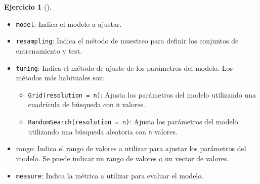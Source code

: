 \documentclass[
  a4paper,
]{scrreport}
\providecommand{\tightlist}{%
  \setlength{\itemsep}{0pt}\setlength{\parskip}{0pt}}\usepackage{longtable,booktabs,array}
\theoremstyle{definition}
\newtheorem{exercise}{Ejercicio}[chapter]
\theoremstyle{remark}
\begin{document}
\begin{exercise}[]
\begin{enumerate}
\begin{tcolorbox}
  \begin{itemize}
  \tightlist
  \item
    \texttt{model}: Indica el modelo a ajustar.
  \item
    \texttt{resampling}: Indica el método de muestreo para definir los
    conjuntos de entrenamiento y test.
  \item
    \texttt{tuning}: Indica el método de ajuste de los parámetros del
    modelo. Los métodos más habituales son:

    \begin{itemize}
    \tightlist
    \item
      \texttt{Grid(resolution\ =\ n)}: Ajusta los parámetros del modelo
      utilizando una cuadrícula de búsqueda con \texttt{n} valores.
    \item
      \texttt{RandomSearch(resolution\ =\ n)}: Ajusta los parámetros del
      modelo utilizando una búsqueda aleatoria con \texttt{n} valores.
    \end{itemize}
  \item
    range: Indica el rango de valores a utilizar para ajustar los
    parámetros del modelo. Se puede indicar un rango de valores o un
    vector de valores.
  \item
    \texttt{measure}: Indica la métrica a utilizar para evaluar el
    modelo.
  \end{itemize}

  \end{tcolorbox}

  \begin{tcolorbox}[enhanced jigsaw, left=2mm, colback=white, coltitle=black, opacitybacktitle=0.6, titlerule=0mm, breakable, bottomrule=.15mm, toptitle=1mm, bottomtitle=1mm, colbacktitle=quarto-callout-tip-color!10!white, opacityback=0, rightrule=.15mm, title=\textcolor{quarto-callout-tip-color}{\faLightbulb}\hspace{0.5em}{Solución}, colframe=quarto-callout-tip-color-frame, arc=.35mm, leftrule=.75mm, toprule=.15mm]


\end{tcolorbox}
\end{enumerate}
\end{exercise}
\end{document}
